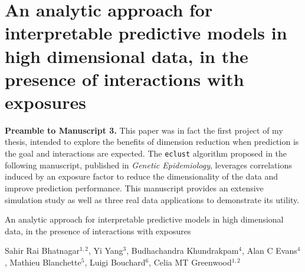 \chapter{An analytic approach for interpretable predictive models in high dimensional data, in the presence of interactions with exposures\label{ch:eclust}}

\indent \textbf{Preamble to Manuscript 3.} This paper was in fact the first project of my thesis, intended to explore the benefits of dimension reduction when prediction is the goal and interactions are expected. The \texttt{eclust} algorithm proposed in the following manuscript, published in \textit{Genetic Epidemiology}, leverages correlations induced by an exposure factor to reduce the dimensionality of the data and improve prediction performance. 
This manuscript provides an extensive simulation study as well as three real data applications to demonstrate its utility. 

\newpage

\vspace*{2cm}

\begin{center}
	\Large{An analytic approach for interpretable predictive models in high dimensional data, in the presence of interactions with exposures}
\end{center}

\vspace*{3cm}


\begin{center}
	Sahir Rai Bhatnagar$^{1,2}$, Yi Yang$^{3}$, Budhachandra Khundrakpam$^{4}$, Alan C Evans$^{4}$, Mathieu Blanchette$^{5}$, Luigi Bouchard$^{6}$, Celia MT Greenwood$^{1,2}$
\end{center}

\vspace*{1cm}

